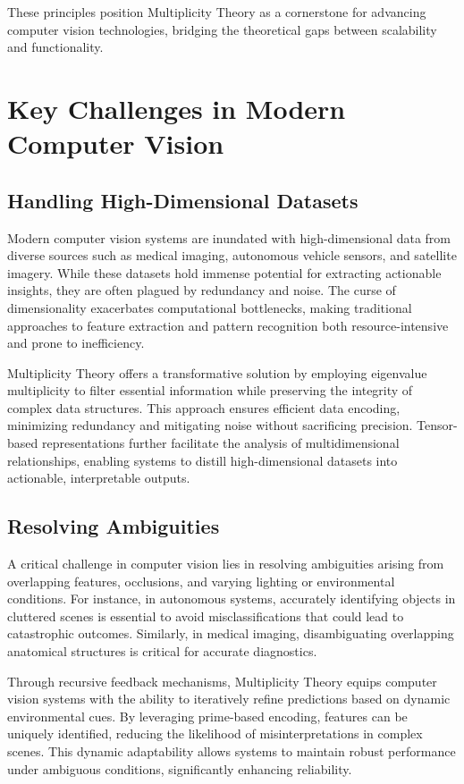 \documentclass{article}
\theoremstyle{plain}
\begin{document}
These principles position Multiplicity Theory as a cornerstone for advancing computer vision technologies, bridging the theoretical gaps between scalability and functionality.
\section{Key Challenges in Modern Computer Vision}

\subsection{Handling High-Dimensional Datasets}
Modern computer vision systems are inundated with high-dimensional data from diverse sources such as medical imaging, autonomous vehicle sensors, and satellite imagery. While these datasets hold immense potential for extracting actionable insights, they are often plagued by redundancy and noise. The curse of dimensionality exacerbates computational bottlenecks, making traditional approaches to feature extraction and pattern recognition both resource-intensive and prone to inefficiency.

Multiplicity Theory offers a transformative solution by employing eigenvalue multiplicity to filter essential information while preserving the integrity of complex data structures. This approach ensures efficient data encoding, minimizing redundancy and mitigating noise without sacrificing precision. Tensor-based representations further facilitate the analysis of multidimensional relationships, enabling systems to distill high-dimensional datasets into actionable, interpretable outputs.

\subsection{Resolving Ambiguities}
A critical challenge in computer vision lies in resolving ambiguities arising from overlapping features, occlusions, and varying lighting or environmental conditions. For instance, in autonomous systems, accurately identifying objects in cluttered scenes is essential to avoid misclassifications that could lead to catastrophic outcomes. Similarly, in medical imaging, disambiguating overlapping anatomical structures is critical for accurate diagnostics.

Through recursive feedback mechanisms, Multiplicity Theory equips computer vision systems with the ability to iteratively refine predictions based on dynamic environmental cues. By leveraging prime-based encoding, features can be uniquely identified, reducing the likelihood of misinterpretations in complex scenes. This dynamic adaptability allows systems to maintain robust performance under ambiguous conditions, significantly enhancing reliability.
\end{document}
